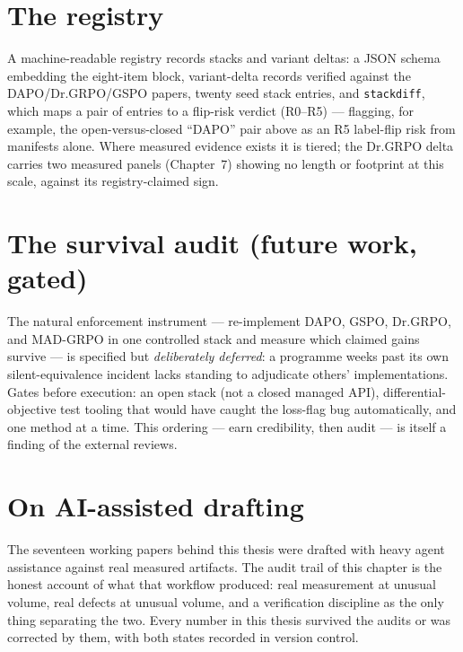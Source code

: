 \section{The registry}
A machine-readable registry records stacks and variant deltas: a JSON schema
embedding the eight-item block, variant-delta records verified against the
DAPO/Dr.GRPO/GSPO papers, twenty seed stack entries, and \texttt{stackdiff},
which maps a pair of entries to a flip-risk verdict (R0--R5) --- flagging, for
example, the open-versus-closed ``DAPO'' pair above as an R5 label-flip risk
from manifests alone. Where measured evidence exists it is tiered; the
Dr.GRPO delta carries two measured panels (Chapter~7) showing no length or
\ZVF{} footprint at this scale, against its registry-claimed sign.

\section{The survival audit (future work, gated)}
The natural enforcement instrument --- re-implement DAPO, GSPO, Dr.GRPO, and
MAD-GRPO in one controlled stack and measure which claimed gains survive ---
is specified but \emph{deliberately deferred}: a programme weeks past its own
silent-equivalence incident lacks standing to adjudicate others'
implementations. Gates before execution: an open stack (not a closed managed
API), differential-objective test tooling that would have caught the loss-flag
bug automatically, and one method at a time. This ordering --- earn
credibility, then audit --- is itself a finding of the external reviews.

\section{On AI-assisted drafting}
The seventeen working papers behind this thesis were drafted with heavy
agent assistance against real measured artifacts. The audit trail of this
chapter is the honest account of what that workflow produced: real
measurement at unusual volume, real defects at unusual volume, and a
verification discipline as the only thing separating the two. Every number in
this thesis survived the audits or was corrected by them, with both states
recorded in version control.
